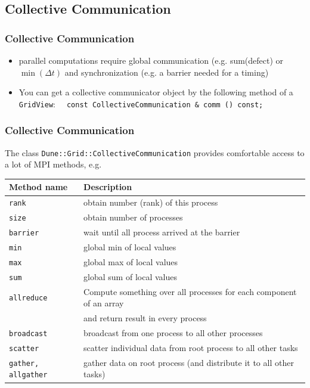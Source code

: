 \documentclass[aspectratio=169,11pt]{beamer}
\theoremstyle{definition}
\begin{document}
\subsection{Collective Communication}

\begin{frame}[fragile]
  \frametitle<presentation>{Collective Communication}
  \begin{itemize}
  \item parallel computations require global communication (e.g. sum(defect) or $\min(\Delta t)$
        and synchronization (e.g. a barrier needed for a timing)
  \item You can get a collective communicator object by the following method of a \lstinline!GridView!:
    \lstinline!  const CollectiveCommunication & comm () const;!
  \end{itemize}
\vfill
\vfill
\vfill
\vfill
\vfill
\vfill

\end{frame}

\begin{frame}[fragile]
  \frametitle<presentation>{Collective Communication}
The class  \lstinline!Dune::Grid::CollectiveCommunication! provides comfortable access to a lot of MPI methods, e.g.\medskip

    \begin{tabular}{l|p{7cm}}
      \hline
      Method name & Description\\\hline
      \lstinline!rank! & obtain number (rank) of this process\\
      \lstinline!size! & obtain number of processes \\
      \lstinline!barrier! & wait until all process arrived at the barrier\\
      \lstinline!min! & global min of local values\\
      \lstinline!max! & global max of local values\\
      \lstinline!sum! & global sum of local values\\
      \lstinline!allreduce! & Compute something over all processes for each component of an array \\
      &and return result in every process\\
      \lstinline!broadcast! & broadcast from one process to all other processes\\
      \lstinline!scatter! & scatter individual data from root process to all other tasks\\
      \lstinline!gather, allgather! & gather data on root process (and distribute it to all other tasks)\\
      \hline
    \end{tabular}

\end{frame}
\end{document}
